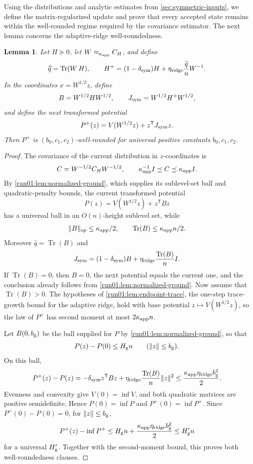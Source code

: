 \documentclass[11pt]{article}
\numberwithin{equation}{section}
\newtheorem{lemma}{Lemma}[section]
\theoremstyle{definition}
\begin{document}
Using the distributions and analytic estimates from \cref{sec:symmetric-inputs},
we define the matrix-regularized update and prove that every accepted state
remains within the well-rounded regime required by the covariance estimator.
The next lemma concerns the adaptive-ridge well-roundedness.

\begin{lemma}
\label{run01:lem:adaptive-well-roundedness}
Let $H\succeq0$, let
$W\approx_{\kappa_{\rm app}}C_H$, and define
\[
\widehat q=\operatorname{Tr}(W\,H),
\qquad
H^+=(1-\delta_{\rm sym})H+ \eta_{\rm ridge}\frac{\widehat q}{n}W^{-1}.
\]
In the coordinates $x=W^{1/2}z$, define
\[
B=W^{1/2}HW^{1/2},
\qquad
J_{\rm sym}=W^{1/2}H^+W^{1/2},
\]
and define the next transformed potential
\[
 P^+(z)=V(W^{1/2}z)+z^{\mathsf T} J_{\rm sym}z.
\]
Then $P^+$ is
$(b_0,c_1,c_2)$-well-rounded for universal positive constants
$b_0,c_1,c_2$.
\end{lemma}

\begin{proof}
The covariance of the current distribution in $z$-coordinates is
\[
C=W^{-1/2}C_HW^{-1/2},
\qquad
\kappa_{\rm app}^{-1}I
\preceq C
\preceq\kappa_{\rm app}I.
\]
By \cref{run01:lem:normalized-ground}, which supplies its sublevel-set ball and
quadratic-penalty bounds, the current transformed potential
\[
 P(z)=V(W^{1/2}z)+z^{\mathsf T} Bz
\]
has a universal ball in an $O(n)$-height sublevel set, while
\[
\|B\|_{\mathrm{op}}\leq\kappa_{\rm app}/2,
\qquad
\operatorname{Tr}(B)\leq\kappa_{\rm app}n/2.
\]
Moreover $\widehat q=\operatorname{Tr}(B)$ and
\[
 J_{\rm sym}=(1-\delta_{\rm sym})B+
 \eta_{\rm ridge}\frac{\operatorname{Tr}(B)}nI.
\]
If $\operatorname{Tr}(B)=0$, then
$B=0$, the next potential equals the current one, and the conclusion already
follows from \cref{run01:lem:normalized-ground}.
Now assume that $\operatorname{Tr}(B)>0$.
The hypotheses of \cref{run01:lem:endpoint-trace}, the one-step trace-growth
bound for the adaptive ridge, hold with base potential $z\mapsto V(W^{1/2}z)$,
so the law of
$P^+$ has second moment at most
$2\kappa_{\rm app}n$.

Let $B(0,b_{\rm g})$ be the ball supplied for
$P$ by \cref{run01:lem:normalized-ground}, so that
\[
 P(z)-P(0)\leq H_{\rm g}n
 \qquad (\|z\|\leq b_{\rm g}).
\]
On this ball,
\[
P^+(z)-P(z)
=-\delta_{\rm sym}z^{\mathsf T} Bz+ \eta_{\rm ridge}\frac{\operatorname{Tr}(B)}n\|z\|^2
\leq\frac{\kappa_{\rm app}\eta_{\rm ridge}b_{\rm g}^2}{2}.
\]
Evenness and convexity give $V(0)=\inf V$, and both quadratic matrices are
positive semidefinite.
Hence $P(0)=\inf P$ and
$P^+(0)=\inf P^+$.
Since $P^+(0)-P(0)=0$, for
$\|z\|\leq b_{\rm g}$,
\[
P^+(z)-\inf P^+
\leq H_{\rm g}n+ \frac{\kappa_{\rm app}\eta_{\rm ridge}b_{\rm g}^2}{2}
\leq H'_{\rm g}n
\]
for a universal $H'_{\rm g}$.
Together with the second-moment bound, this proves both well-roundedness
clauses.
\end{proof}
\end{document}
